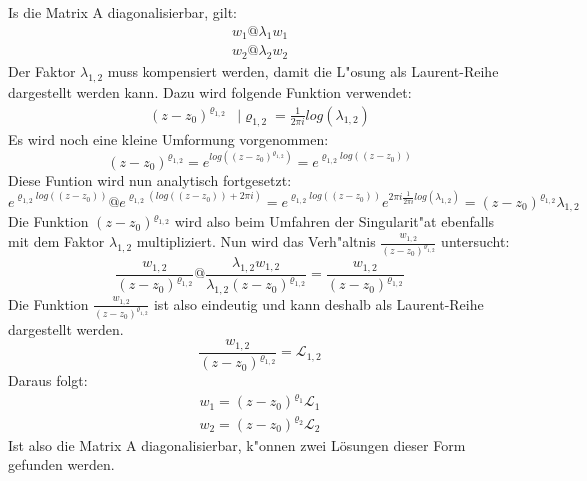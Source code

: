 Is die Matrix A diagonalisierbar, gilt:
$$
\begin{matrix}
w_1 @ \lambda_1 w_1  \\
w_2 @ \lambda_2 w_2
\end{matrix}
$$
Der Faktor $\lambda_{1,2}$ muss kompensiert werden, damit die L"osung als Laurent-Reihe dargestellt werden kann. Dazu wird folgende Funktion verwendet: 
$$
\begin{matrix}
(z-z_0)^{\varrho_{1,2}} & | \varrho_{1,2} = \frac{1}{2\pi i}log(\lambda_{1,2})
\end{matrix}
$$
Es wird noch eine kleine Umformung vorgenommen:
$$
(z-z_0)^{\varrho_{1,2}} = e^{log((z-z_0)^{\varrho_{1,2}})} = e^{\varrho_{1,2} log((z-z_0))}
$$                                 
Diese Funtion wird nun analytisch fortgesetzt:
$$
e^{\varrho_{1,2} log((z-z_0))}  \text{@}  e^{\varrho_{1,2} (log((z-z_0)) + 2\pi i)}
= e^{\varrho_{1,2} log((z-z_0))}  e^{2\pi i\frac{1}{2\pi i}log(\lambda_{1,2})}
= (z-z_0)^{\varrho_{1,2}}  \lambda_{1,2}
$$
Die Funktion $(z-z_0)^{\varrho_{1,2}}$ wird also beim Umfahren der Singularit"at ebenfalls mit dem Faktor $\lambda_{1,2}$ multipliziert. Nun wird das Verh"altnis $\frac{w_{1,2}}{(z-z_0)^{\varrho_{1,2}}}$ untersucht:
$$
\frac{w_{1,2}}{(z-z_0)^{\varrho_{1,2}}} @ \frac{\lambda_{1,2} w_{1,2}}{\lambda_{1,2}(z-z_0)^{\varrho_{1,2}}} = \frac{w_{1,2}}{(z-z_0)^{\varrho_{1,2}}}
$$
Die Funktion $\frac{w_{1,2}}{(z-z_0)^{\varrho_{1,2}}}$ ist also eindeutig und kann deshalb als Laurent-Reihe dargestellt werden.
$$
\frac{w_{1,2}}{(z-z_0)^{\varrho_{1,2}}} = \mathcal{L}_{1,2}
$$
Daraus folgt:
$$
\begin{matrix}
w_1 = (z-z_0)^{\varrho_1} \mathcal{L}_1 \\
w_2 = (z-z_0)^{\varrho_2} \mathcal{L}_2
\end{matrix}
$$
Ist also die Matrix A diagonalisierbar, k"onnen zwei Lösungen dieser Form gefunden werden.

